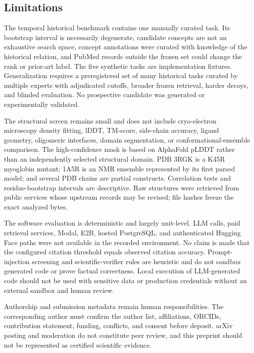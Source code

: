 \documentclass[11pt]{article}
\begin{document}
\subsection{Limitations}

The temporal historical benchmark contains one manually curated task. Its bootstrap interval is necessarily degenerate, candidate concepts are not an exhaustive search space, concept annotations were curated with knowledge of the historical relation, and PubMed records outside the frozen set could change the rank or prior-art label. The five synthetic tasks are implementation fixtures. Generalization requires a preregistered set of many historical tasks curated by multiple experts with adjudicated cutoffs, broader frozen retrieval, harder decoys, and blinded evaluation. No prospective candidate was generated or experimentally validated.

The structural screen remains small and does not include cryo-electron microscopy density fitting, lDDT, TM-score, side-chain accuracy, ligand geometry, oligomeric interfaces, domain segmentation, or conformational-ensemble comparison. The high-confidence mask is based on AlphaFold pLDDT rather than an independently selected structural domain. PDB 3RGK is a K45R myoglobin mutant; 1A5R is an NMR ensemble represented by its first parsed model; and several PDB chains are partial constructs. Correlation tests and residue-bootstrap intervals are descriptive. Raw structures were retrieved from public services whose upstream records may be revised; file hashes freeze the exact analyzed bytes.

The software evaluation is deterministic and largely unit-level. LLM calls, paid retrieval services, Modal, E2B, hosted PostgreSQL, and authenticated Hugging Face paths were not available in the recorded environment. No claim is made that the configured citation threshold equals observed citation accuracy. Prompt-injection screening and scientific-verifier rules are heuristic and do not sandbox generated code or prove factual correctness. Local execution of LLM-generated code should not be used with sensitive data or production credentials without an external sandbox and human review.

Authorship and submission metadata remain human responsibilities. The corresponding author must confirm the author list, affiliations, ORCIDs, contribution statement, funding, conflicts, and consent before deposit. arXiv posting and moderation do not constitute peer review, and this preprint should not be represented as certified scientific evidence.
\end{document}

